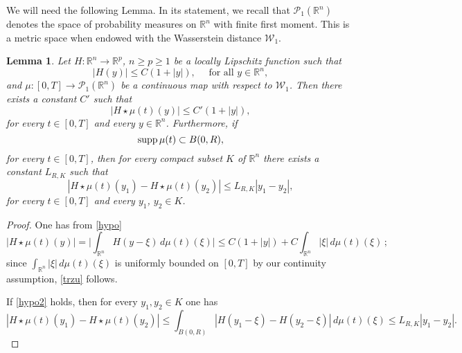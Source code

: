\documentclass[11pt]{article}
\theoremstyle{plain}
\newtheorem{lemma}[theorem]{Lemma}
\theoremstyle{definition}
\theoremstyle{remark}
\numberwithin{equation}{section}
\newcommand{\R}{{\mathbb R}}
\newcommand{\PP}{{\mathcal P}_1}
\newcommand{\WW}{{\mathcal W}_1}
\begin{document}
We will need the following Lemma. In its statement, we recall that $\PP(\R^n)$ denotes the space of probability measures on $\R^n$ with finite first moment. This is a metric space when endowed with the Wasserstein distance $\WW$.

\begin{lemma}\label{stimesceme}
Let $H\colon \R^n \to \R^{p}$, $n\ge p \ge 1$ be a locally Lipschitz function such that
\begin{equation}\label{hypo}
|H(y)|\le C(1+|y|), \quad \mbox{ for all } y \in \mathbb R^n, 
\end{equation}
and $\mu\colon[0,T]\to \PP(\R^n)$ be a continuous map with respect to $\WW$. Then there exists a constant $C'$ such that
\begin{equation}\label{trzu}
|H\star \mu(t) (y)|\le C'(1+|y|),
\end{equation}
for every $t \in [0, T]$ and every $y \in \R^n$. Furthermore, if
\begin{equation}\label{hypo2}
{\rm supp }\,\mu(t)\subset B(0,R),
\end{equation}
for every $t \in [0, T]$, then for every compact subset $K$ of $\R^n$ there exists a constant $L_{R,K}$ such that
\begin{equation}\label{lipt}
|H\star \mu(t) (y_1)-H\star \mu(t) (y_2)|\le L_{R,K}|y_1-y_2|,
\end{equation}
for every $t \in [0, T]$ and every $y_1$, $y_2 \in K$.
\end{lemma}

\begin{proof}
One has from \eqref{hypo}
$$
|H\star \mu(t) (y)|=\Big|\int_{\R^n}H(y-\xi)\,d\mu(t)(\xi)\Big|\le C(1+|y|)+C\int_{\R^n}|\xi|\,d\mu(t)(\xi)\,;
$$
since $\int_{\R^n}|\xi|\,d\mu(t)(\xi)$ is uniformly bounded on $[0,T]$ by our continuity assumption, \eqref{trzu} follows.

If \eqref{hypo2} holds, then for every $y_1,y_2 \in K$ one has
$$
|H\star \mu(t) (y_1)-H\star \mu(t) (y_2)|\le \int_{B(0,R)} \left |H(y_1-\xi) - H(y_2-\xi) \right |\,d\mu(t)(\xi) \leq L_{R,K} |y_1-y_2|.
$$
\end{proof}
\end{document}
